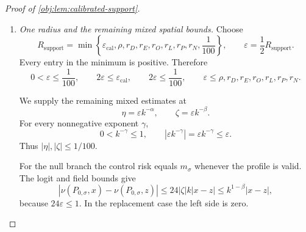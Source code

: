 \documentclass[11pt]{article}
\begin{document}
\begin{proof}[Proof of \cref{obj:lem:calibrated-support}]
\begin{enumerate}
Define
\[
r_N=\min\left\{r_{\mathrm q},\frac1{100},
 \frac{r_{\mathrm{ctrl}}}{3},
 \frac1{C_{\mathrm{ctrl}}(9+2B_{\mathrm q})}\right\}>0.
\]
For \((\alpha,\beta)\in\mathcal D\), we have
\(0<\beta<\alpha\le1\). At the rate-scaled amplitudes with
\(0<\varepsilon_{\mathrm{amp}}\le r_N\),
\[
0\le\eta_{\mathrm{amp}}\le\zeta_{\mathrm{amp}}
\le r_N.
\]
Moreover,
\[
32|\eta_{\mathrm{amp}}\zeta_{\mathrm{amp}}|
\le\frac{32}{100}r_N\le r_{\mathrm{ctrl}},
\qquad
\frac52|\eta_{\mathrm{amp}}|\le r_{\mathrm{ctrl}},
\qquad
2|\zeta_{\mathrm{amp}}|\le r_{\mathrm{ctrl}}.
\]
The control-logit comparison therefore applies to the alternative margins. The two margin differences obey
\[
\begin{aligned}
|e_1(x)-e_1(z)|
&\le|\eta_{\mathrm{amp}}|(5+2B_{\mathrm q})k|x-z|,\\
|m_\sigma(x)-m_\sigma(z)|
&\le4|\zeta_{\mathrm{amp}}|k|x-z|.
\end{aligned}
\]
For a valid table, its control risk is
\[
\mu_0(x)=m_\sigma(x)-\frac{c_1(x)}{1-e_1(x)}.
\]
Using \(\eta_{\mathrm{amp}}\le\zeta_{\mathrm{amp}}\) gives
\[
\begin{aligned}
|\nu(P_{1,\sigma},x)-\nu(P_{1,\sigma},z)|
&\le C_{\mathrm{ctrl}}(9+2B_{\mathrm q})
       \zeta_{\mathrm{amp}}k|x-z|\\
&\le k^{1-\beta}|x-z|.
\end{aligned}
\]
The replacement case again has zero prognosis logit.

\item \textit{One radius and the remaining mixed spatial bounds.}
Choose
\[
R_{\mathrm{support}}
=\min\left\{\varepsilon_{\mathrm{cal}},\rho,r_D,r_E,r_O,r_L,
                         r_P,r_N,\frac1{100}\right\},
\qquad
\varepsilon=\frac12R_{\mathrm{support}}.
\]
Every entry in the minimum is positive. Therefore
\[
0<\varepsilon\le\frac1{100},
\qquad
2\varepsilon\le\varepsilon_{\mathrm{cal}},
\qquad
2\varepsilon\le\frac1{100},
\qquad
\varepsilon\le\rho,r_D,r_E,r_O,r_L,r_P,r_N.
\]

We supply the remaining mixed estimates at
\[
\eta=\varepsilon k^{-\alpha},
\qquad
\zeta=\varepsilon k^{-\beta}.
\]
For every nonnegative exponent \(\gamma\),
\[
0<k^{-\gamma}\le1,
\qquad
|\varepsilon k^{-\gamma}|=\varepsilon k^{-\gamma}\le\varepsilon.
\]
Thus \(|\eta|,|\zeta|\le1/100\).

For the null branch the control risk equals \(m_\sigma\) whenever the profile is valid. The logit and field bounds give
\[
|\nu(P_{0,\sigma},x)-\nu(P_{0,\sigma},z)|
\le24|\zeta|k|x-z|
\le k^{1-\beta}|x-z|,
\]
because \(24\varepsilon\le1\). In the replacement case the left side is zero.


\end{enumerate}
\end{proof}
\end{document}
